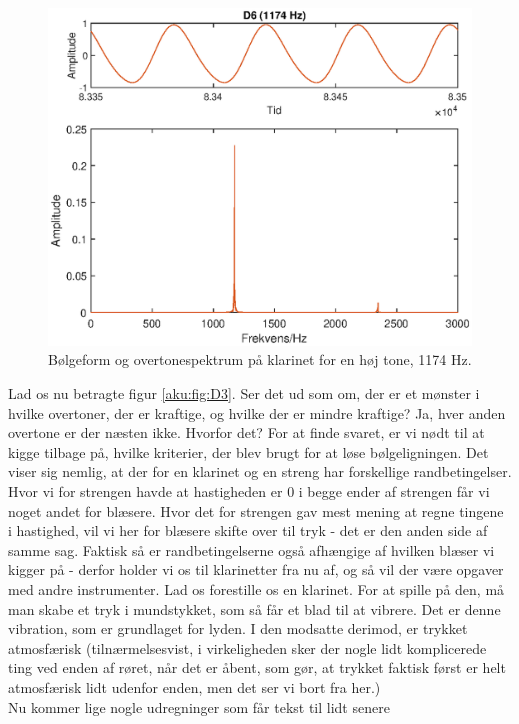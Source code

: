 \begin{figure}[t]
    \centering
    \includegraphics{Akustik/fig/D6.eps}
    \caption{Bølgeform og overtonespektrum på klarinet for en høj tone, 1174 \si{.Hz}.}
    \label{aku:fig:D6}
\end{figure}
Lad os nu betragte figur \ref{aku:fig:D3}. Ser det ud som om, der er et mønster i hvilke overtoner, der er kraftige, og hvilke der er mindre kraftige? Ja, hver anden overtone er der næsten ikke. Hvorfor det? For at finde svaret, er vi nødt til at kigge tilbage på, hvilke kriterier, der blev brugt for at løse bølgeligningen. Det viser sig nemlig, at der for en klarinet og en streng har forskellige randbetingelser. Hvor vi for strengen havde at hastigheden er 0 i begge ender af strengen får vi noget andet for blæsere. Hvor det for strengen gav mest mening at regne tingene i hastighed, vil vi her for blæsere skifte over til tryk - det er den anden side af samme sag. Faktisk så er randbetingelserne også afhængige af hvilken blæser vi kigger på - derfor holder vi os til klarinetter fra nu af, og så vil der være opgaver med andre instrumenter.
Lad os forestille os en klarinet. For at spille på den, må man skabe et tryk i mundstykket, som så får et blad til at vibrere. Det er denne vibration, som er grundlaget for lyden. I den modsatte derimod, er trykket atmosfærisk (tilnærmelsesvist, i virkeligheden sker der nogle lidt komplicerede ting ved enden af røret, når det er åbent, som gør, at trykket faktisk først er helt atmosfærisk lidt udenfor enden, men det ser vi bort fra her.)\\
Nu kommer lige nogle udregninger som får tekst til lidt senere
